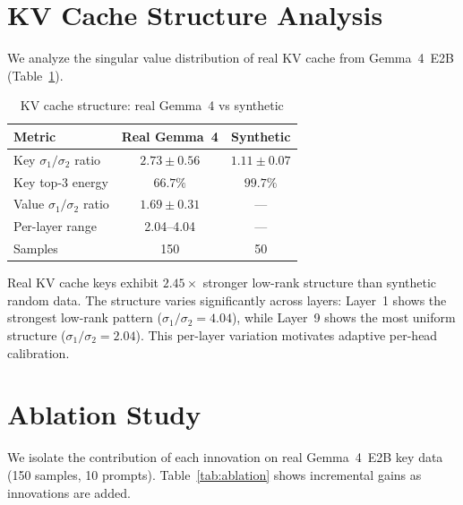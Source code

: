 \documentclass{article}
\begin{document}
\section{KV Cache Structure Analysis}

We analyze the singular value distribution of real KV cache from Gemma~4~E2B (Table~\ref{tab:structure}).

\begin{table}[t]
\centering
\small
\caption{KV cache structure: real Gemma~4 vs synthetic}
\label{tab:structure}
\begin{tabular}{lcc}
\toprule
Metric & Real Gemma~4 & Synthetic \\
\midrule
Key $\sigma_1/\sigma_2$ ratio & $2.73 \pm 0.56$ & $1.11 \pm 0.07$ \\
Key top-3 energy & $66.7\%$ & $99.7\%$ \\
Value $\sigma_1/\sigma_2$ ratio & $1.69 \pm 0.31$ & --- \\
\midrule
Per-layer range & 2.04--4.04 & --- \\
Samples & 150 & 50 \\
\bottomrule
\end{tabular}
\end{table}

Real KV cache keys exhibit $2.45\times$ stronger low-rank structure than synthetic random data. The structure varies significantly across layers: Layer~1 shows the strongest low-rank pattern ($\sigma_1/\sigma_2 = 4.04$), while Layer~9 shows the most uniform structure ($\sigma_1/\sigma_2 = 2.04$). This per-layer variation motivates adaptive per-head calibration.

\section{Ablation Study}

We isolate the contribution of each innovation on real Gemma~4~E2B key data (150 samples, 10 prompts). Table~\ref{tab:ablation} shows incremental gains as innovations are added.
\end{document}
